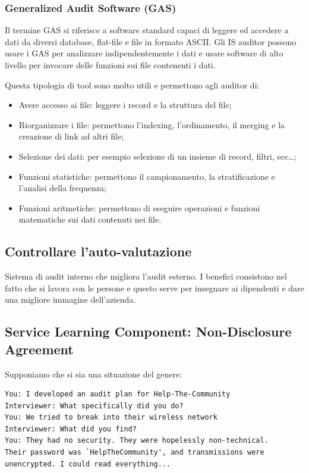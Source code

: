 \subsubsection{Generalized Audit Software (GAS)}
Il termine GAS si riferisce a software standard capaci di leggere
ed accedere a dati da diversi database, flat-file e file in formato
ASCII. Gli IS auditor possono usare i GAS per analizzare indipendentemente
i dati e usare software di alto livello per invocare delle funzioni
sui file contenenti i dati.

Questa tipologia di tool sono molto utili e permettono agli auditor di:
\begin{itemize}
\item Avere accesso ai file: leggere i record e la struttura del file;
\item Riorganizzare i file: permettono l'indexing, l'ordinamento,
il merging e la creazione di link ad altri file;
\item Selezione dei dati: per esempio selezione di un insieme di record,
filtri, ecc\dots;
\item Funzioni statistiche: permettono il campionamento, 
la stratificazione e l'analisi della frequenza;
\item Funzioni aritmetiche: permettono di eseguire operazioni e 
funzioni matematiche sui dati contenuti nei file.
\end{itemize}



\subsection{Controllare l'auto-valutazione}

Sistema di audit interno che migliora l'audit esterno. I benefici consistono
nel fatto che si lavora con le persone e questo serve per insegnare ai
dipendenti e dare una migliore immagine dell'azienda.


\subsection{Service Learning Component: Non-Disclosure Agreement}

Supponiamo che si sia una situazione del genere:

\begin{verbatim}
You: I developed an audit plan for Help-The-Community
Interviewer: What specifically did you do?
You: We tried to break into their wireless network
Interviewer: What did you find?
You: They had no security. They were hopelessly non-technical.
Their password was `HelpTheCommunity', and transmissions were
unencrypted. I could read everything...
\end{verbatim}

